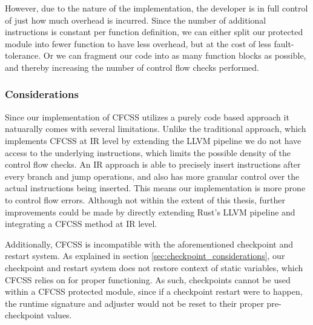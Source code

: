 However, due to the nature of the implementation, the developer is in full control of just how much overhead is incurred. Since the number of additional instructions is constant per function definition, we can either split our protected module into fewer function to have less overhead, but at the cost of less fault-tolerance. Or we can fragment our code into as many function blocks as possible, and thereby increasing the number of control flow checks performed.

\subsubsection{Considerations}

Since our implementation of CFCSS utilizes a purely code based approach it natuarally comes with several limitations. Unlike the traditional approach, which implements CFCSS at IR level by extending the LLVM pipeline we do not have access to the underlying instructions, which limits the possible density of the control flow checks. An IR approach is able to precisely insert instructions after every branch and jump operations, and also has more granular control over the actual instructions being inserted. This means our implementation is more prone to control flow errors. Although not within the extent of this thesis, further improvements could be made by directly extending Rust's LLVM pipeline and integrating a CFCSS method at IR level.

Additionally, CFCSS is incompatible with the aforementioned checkpoint and restart system. As explained in section \ref{sec:checkpoint_considerations}, our checkpoint and restart system does not restore context of static variables, which CFCSS relies on for proper functioning. As such, checkpoints cannot be used within a CFCSS protected module, since if a checkpoint restart were to happen, the runtime signature and adjuster would not be reset to their proper pre-checkpoint values.